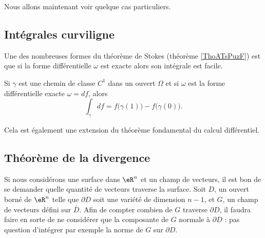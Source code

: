 
Nous allons maintenant voir quelque cas particuliers. 

\subsection{Intégrales curviligne}

Une des nombreuses formes du théorème de Stokes (théorème \ref{ThoATsPuzF}) est que si la forme différentielle \( \omega\) est exacte alors son intégrale est facile.
\begin{theorem} \label{ThoUJMhFwU}
    Si \( \gamma\) est une chemin de classe \( C^1\) dans un ouvert \( \Omega\) et si \( \omega\) est la forme différentielle exacte \( \omega=df\), alors
    \begin{equation}
        \int_{\gamma}df=f\big( \gamma(1) \big)-f\big( \gamma(0) \big).
    \end{equation}
\end{theorem}
Cela est également une extension du théorème fondamental du calcul différentiel.


\subsection{Théorème de la divergence}

Si nous considérons une surface dans $\eR^n$ et un champ de vecteurs, il est bon de se demander quelle \og quantité de vecteurs\fg{} traverse la surface. Soit $D$, un ouvert borné de $\eR^n$ telle que $\partial D$ soit une variété de dimension $n-1$, et $G$, un champ de vecteurs défini sur $\bar D$. Afin de compter combien de $G$ traverse $\partial D$, il faudra faire en sorte de ne considérer que la composante de $G$ normale à $\partial D$ : pas question d'intégrer par exemple la norme de $G$ sur $\partial D$.

